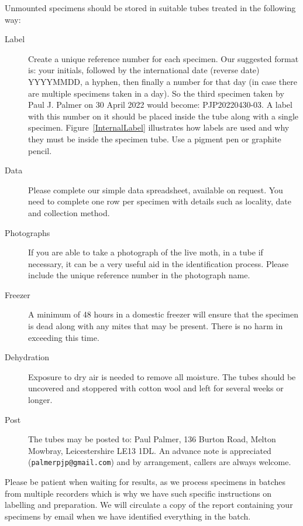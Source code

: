 \documentclass[10pt]{article}
\begin{document}
Unmounted specimens should be stored in suitable tubes treated in the following way:
\begin{description}

	\item[Label] Create a unique reference number for each specimen. Our suggested format is: your initials, followed by the international date (reverse date) YYYYMMDD, a hyphen, then finally a number for that day (in case there are multiple specimens taken in a day). So the third specimen taken by Paul J. Palmer on 30 April 2022 would become: PJP20220430-03. A label with this number on it should be placed inside the tube along with a single specimen. Figure~\ref{InternalLabel} illustrates how labels are used and why they must be inside the specimen tube. Use a pigment pen or graphite pencil.
	\item[Data] Please complete our simple data spreadsheet, available on request. You need to complete one row per specimen with details such as locality, date and collection method. 
	\item[Photographs] If you are able to take a photograph of the live moth, in a tube if necessary, it can be a very useful aid in the identification process. Please include the unique reference number in the photograph name.
	\item[Freezer] A minimum of 48 hours in a domestic freezer will ensure that the specimen is dead along with any mites that may be present. There is no harm in exceeding this time.
	\item[Dehydration] Exposure to dry air is needed to remove all moisture. The tubes should be uncovered and stoppered with cotton wool and left for several weeks or longer. 
	\item[Post] The tubes may be posted to: Paul Palmer, 136 Burton Road, Melton Mowbray, Leicestershire LE13 1DL. An advance note is appreciated \\ (\texttt{palmerpjp@gmail.com}) and by arrangement, callers are always welcome.
\end{description}

Please be patient when waiting for results, as we process specimens in batches from multiple recorders which is why we have such specific instructions on labelling and preparation. We will circulate a copy of the report containing your specimens by email when we have identified everything in the batch.


\end{document}
